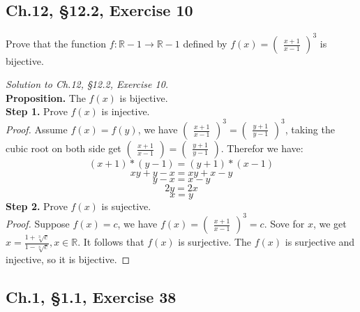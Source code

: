 \documentclass[12pt]{amsart}
\numberwithin{equation}{section}
\theoremstyle{definition}
\theoremstyle{remark}
\begin{document}


\subsection*{Ch.12, \S 12.2,  Exercise 10}  Prove that the function $ f: \mathbb{R} - {1} \rightarrow \mathbb{R} - {1} $ defined by $ f(x) = \begin{pmatrix} \frac{x + 1}{x - 1} \end{pmatrix}^3 $ is bijective.

\begin{proof}[Solution to Ch.12, \S 12.2,  Exercise 10] \ \\
\textbf{Proposition.} The $ f(x) $ is bijective.\\
\textbf{Step 1.} Prove $ f(x) $ is injective.\\
\textit{Proof.} Assume $ f(x) = f(y) $, we have $ \begin{pmatrix} \frac{x + 1}{x - 1} \end{pmatrix}^3 = \begin{pmatrix} \frac{y + 1}{y - 1} \end{pmatrix}^3 $, taking the cubic root on both side get $ \begin{pmatrix} \frac{x + 1}{x - 1} \end{pmatrix} = \begin{pmatrix} \frac{y + 1}{y - 1} \end{pmatrix} $. Therefor we have:
$$ (x + 1) * (y - 1) = (y + 1) * (x - 1) $$
$$ xy + y - x = xy + x - y $$
$$ y - x = x - y $$
$$ 2y = 2x $$
$$ x = y $$
\textbf{Step 2.} Prove $ f(x) $ is sujective. \\
\textit{Proof.} Suppose $ f(x) = c $, we have $ f(x) = \begin{pmatrix} \frac{x + 1}{x - 1} \end{pmatrix}^3 = c $. Sove for $ x $, we get $ x = \frac{1 + \sqrt[3]{c}}{1 - \sqrt[3]{c}}, x \in \mathbb{R} $. It follows that $ f(x) $ is surjective.
The $ f(x) $ is surjective and injective, so it is bijective.
\end{proof}





\subsection*{Ch.1, \S 1.1,  Exercise 38} 
\end{document}
